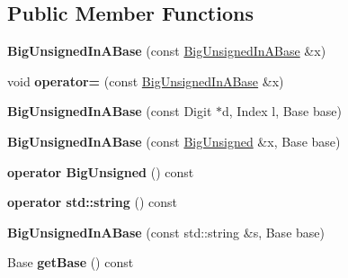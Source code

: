 \subsection*{Public Member Functions}
\begin{DoxyCompactItemize}
\item 
\mbox{\label{class_big_unsigned_in_a_base_a25783cfe84543fccbc03ade61aa5f2fd}} 
{\bfseries Big\+Unsigned\+In\+A\+Base} (const \mbox{\hyperlink{class_big_unsigned_in_a_base}{Big\+Unsigned\+In\+A\+Base}} \&x)
\item 
\mbox{\label{class_big_unsigned_in_a_base_a8ef765ef5fba6d43b76e68f7996aee07}} 
void {\bfseries operator=} (const \mbox{\hyperlink{class_big_unsigned_in_a_base}{Big\+Unsigned\+In\+A\+Base}} \&x)
\item 
\mbox{\label{class_big_unsigned_in_a_base_a5b612bcf0ee194a98dd15033fe0686d2}} 
{\bfseries Big\+Unsigned\+In\+A\+Base} (const Digit $\ast$d, Index l, Base base)
\item 
\mbox{\label{class_big_unsigned_in_a_base_a84a2e31b86255617594b304456dbe829}} 
{\bfseries Big\+Unsigned\+In\+A\+Base} (const \mbox{\hyperlink{class_big_unsigned}{Big\+Unsigned}} \&x, Base base)
\item 
\mbox{\label{class_big_unsigned_in_a_base_a55120fe1f52197be156dcf39935b8f01}} 
{\bfseries operator Big\+Unsigned} () const
\item 
\mbox{\label{class_big_unsigned_in_a_base_adb100346941a01dbcab7c9c42fc48827}} 
{\bfseries operator std\+::string} () const
\item 
\mbox{\label{class_big_unsigned_in_a_base_aec7a7c0b46b857213ebff47555daa0af}} 
{\bfseries Big\+Unsigned\+In\+A\+Base} (const std\+::string \&s, Base base)
\item 
\mbox{\label{class_big_unsigned_in_a_base_aad841fecc2bd0586d1e4b676f757ea58}} 
Base {\bfseries get\+Base} () const
\item 
\mbox{\label{class_big_unsigned_in_a_base_af68f2b668cdfaefc7f706b2da1aaac32}} 

\end{DoxyCompactItemize}
